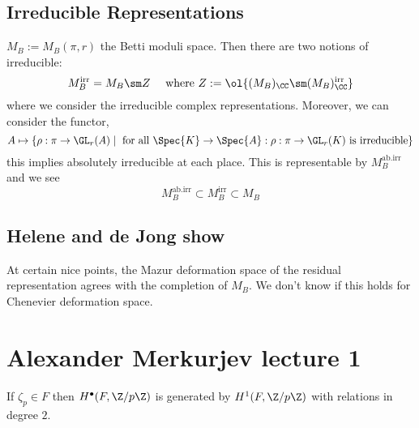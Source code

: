 \documentclass{article}
\newcommand{\irr}{\mathrm{irr}}
\begin{document}
\subsection{Irreducible Representations}

$M_B := M_B(\pi, r)$ the Betti moduli space. Then there are two notions of irreducible:
\[ M_B^{\irr} = M_B \sm Z \quad \text{ where } Z := \ol{(M_B)_{\CC} \sm (M_B)_{\CC}^{\irr}} \]
where we consider the irreducible complex representations. Moreover, we can consider the functor,
\[ A \mapsto \{ \rho : \pi \to \GL_r(A) \mid \text{ for all } \Spec{K} \to \Spec{A} : \rho : \pi \to \GL_r(K) \text{ is irreducible} \} \]
this implies absolutely irreducible at each place. This is representable by $M_B^{\text{ab.irr}}$ and we see
\[ M_B^{\text{ab.irr}} \subset M_B^{\irr} \subset M_B \]

\subsection{Helene and de Jong show}

At certain nice points, the Mazur deformation space of the residual representation agrees with the completion of $M_B$. We don't know if this holds for Chenevier deformation space. 

\section{Alexander Merkurjev lecture 1}

\begin{theorem} If $\zeta_p \in F$ then $H^\bullet(F, \Z / p \Z)$ is generated by $H^1(F, \Z / p \Z)$ with relations in degree $2$. 
\end{theorem}
\end{document}
